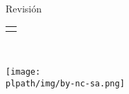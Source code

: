 
\thispagestyle{empty}
	
	\begin{center}
		\makeatletter
		{\bf {\Huge \@title}}
		\\[2cm]
		{\bf {\huge \subtitlename}}\\[4cm]
		\@date\\[2cm]
		{\footnotesize Revisión \revname}
		\\[7cm]
		\begin{tabular}[t]{c} \@author \end{tabular}\\[3cm]
		\makeatother
		
		\begin{center}
			\texttt{[image: \\plpath/img/by-nc-sa.png]}
		\end{center}
	\end{center}

\cleardoublepage


